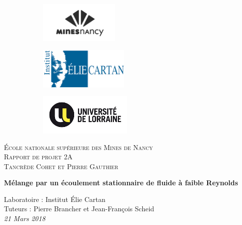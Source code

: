\documentclass[a4paper,12pt,titlepage]{report}
\begin{document}
\begin{titlepage}
 
	\begin{center}
	\begin{figure}[!h]
	\centering	
		\begin{subfigure}[b]{0.3\textwidth}
		\includegraphics[height = 2cm, keepaspectratio]{graphes/mines_nancy.png}
		\end{subfigure}
		\begin{subfigure}[b]{0.3\textwidth}
		\includegraphics[height = 2cm, keepaspectratio]{graphes/elie_cartan.png}
		\end{subfigure}
		\begin{subfigure}[b]{0.3\textwidth}
		\includegraphics[height = 2cm, keepaspectratio]{graphes/univ_lorraine.png}
	\end{subfigure}
	\end{figure}
 
	\textsc{École nationale supérieure des Mines de Nancy}\\[2cm]
	\textsc{Rapport de projet 2A}\\[1cm]
	\textsc{Tancrède Cohet et Pierre Gauthier}\\[1cm]
 
	\begin{doublespace}
		{ \huge \bfseries{Mélange par un écoulement stationnaire de fluide à faible Reynolds}}\\[2cm]
	\end{doublespace}
	\textmd{Laboratoire : Institut Élie Cartan}\\[1cm]
	\textmd{Tuteurs : Pierre Brancher et Jean-François Scheid }\\[1cm]
 
	\vfill
	{\textit{{\large 21 Mars 2018}}}
 
	\end{center}
\end{titlepage}
\end{document}
